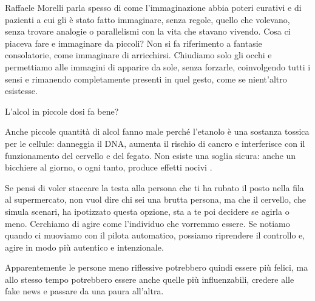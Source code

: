\documentclass[12pt]{book} %
\begin{document}
Raffaele Morelli parla spesso di come l'immaginazione abbia poteri curativi e di pazienti a cui gli è stato fatto immaginare, senza regole, quello che volevano, senza trovare analogie o parallelismi con la vita che stavano vivendo. Cosa ci piaceva fare e immaginare da piccoli? Non si fa riferimento a fantasie consolatorie, come immaginare di arricchirsi. Chiudiamo solo gli occhi e permettiamo alle immagini di apparire da sole, senza forzarle, coinvolgendo tutti i sensi e rimanendo completamente presenti in quel gesto, come se nient’altro esistesse.

\begin{mdframed}[linewidth=1pt]
L'alcol in piccole dosi fa bene?

Anche piccole quantità di alcol fanno male perché l’etanolo è una sostanza tossica per le cellule: danneggia il DNA, aumenta il rischio di cancro e interferisce con il funzionamento del cervello e del fegato. Non esiste una soglia sicura: anche un bicchiere al giorno, o ogni tanto, produce effetti nocivi .
\end{mdframed}

Se pensi di voler staccare la testa alla persona che ti ha rubato il posto nella fila al supermercato, non vuol dire chi sei una brutta persona, ma che il cervello, che simula scenari, ha ipotizzato questa opzione, sta a te poi decidere se agirla o meno.
Cerchiamo di agire come l'individuo che vorremmo essere. Se notiamo quando ci muoviamo con il pilota automatico, possiamo riprendere il controllo e, agire in modo più autentico e intenzionale.

Apparentemente le persone meno riflessive potrebbero quindi essere più felici, ma allo stesso tempo potrebbero essere anche quelle più influenzabili, credere alle fake news e passare da una paura all'altra.
\end{document}
